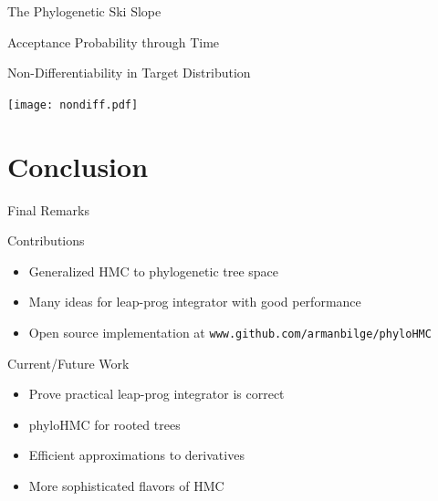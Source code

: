 \documentclass{beamer}
\begin{document}
\begin{frame}{The Phylogenetic Ski Slope}

\end{frame}

\begin{frame}[fragile]{Acceptance Probability through Time}
  \begin{center}
    
  \end{center}
\end{frame}

\begin{frame}[fragile]{Non-Differentiability in Target Distribution}
  \begin{center}
    \texttt{[image: nondiff.pdf]}
  \end{center}
\end{frame}

\section{Conclusion}

\begin{frame}{Final Remarks}
  \begin{block}{Contributions}
    \begin{itemize}
      \item Generalized HMC to phylogenetic tree space
      \item Many ideas for leap-prog integrator with good performance
      \item Open source implementation at \texttt{www.github.com/armanbilge/phyloHMC}
    \end{itemize}
  \end{block}
  \pause
  \begin{block}{Current/Future Work}
    \begin{itemize}
      \item Prove practical leap-prog integrator is correct
      \item phyloHMC for rooted trees
      \item Efficient approximations to derivatives
      \item More sophisticated flavors of HMC
    \end{itemize}
  \end{block}
\end{frame}
\end{document}
